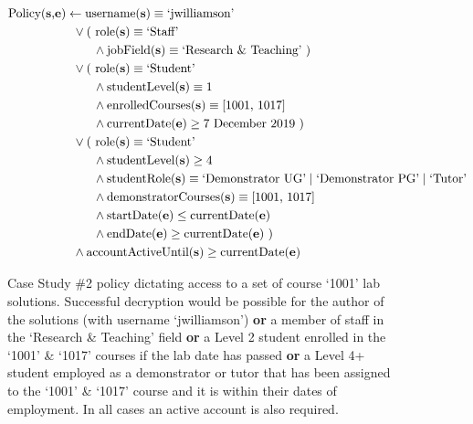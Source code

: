 \begin{figure}[ht]
  \centering
\begin{align*}
  \text{Policy(\textbf{s},\textbf{e})}
  &
    \leftarrow
    \text{username(\textbf{s})} \equiv \text{`jwilliamson'}
  \\
  &
    \phantom{::}\vee
    \text{( role(\textbf{s})} \equiv \text{`Staff'}
  \\
  &
    \phantom{::::::::}\wedge
    \text{jobField(\textbf{s})} \equiv \text{`Research \& Teaching' )}
  \\
  &
    \phantom{::}\vee
    \text{( role(\textbf{s})} \equiv \text{`Student'}
  \\
  &
    \phantom{::::::::}\wedge
    \text{studentLevel(\textbf{s})} \equiv \text{1}
  \\
  &
    \phantom{::::::::}\wedge
    \text{enrolledCourses(\textbf{s})} \equiv \text{[1001, 1017]}
  \\
  &
    \phantom{::::::::}\wedge
    \text{currentDate(\textbf{e})} \geq \text{7 December 2019 )}
  \\
  &
    \phantom{::}\vee
    \text{( role(\textbf{s})} \equiv \text{`Student'}
  \\
  &
    \phantom{::::::::}\wedge
    \text{studentLevel(\textbf{s})} \geq \text{4}
  \\
  &
    \phantom{::::::::}\wedge
    \text{studentRole(\textbf{s})} \equiv \text{`Demonstrator UG'} \mid \text{`Demonstrator PG'} \mid \text{`Tutor'}
  \\
  &
    \phantom{::::::::}\wedge
    \text{demonstratorCourses(\textbf{s})} \equiv \text{[1001, 1017]}
  \\
  &
    \phantom{::::::::}\wedge
    \text{startDate(\textbf{e})} \leq \text{currentDate(\textbf{e})}
  \\
  &
    \phantom{::::::::}\wedge
    \text{endDate(\textbf{e})} \geq \text{currentDate(\textbf{e}) )}
  \\
  &
    \phantom{::}\wedge
    \text{accountActiveUntil(\textbf{s})} \geq \text{currentDate(\textbf{e})}
\end{align*}
  \caption{
    \label{fig:case_study_policy_2}
    Case Study \#2 policy dictating access to a set of course `1001' lab solutions.
    Successful decryption would be possible for the author of the solutions (with username `jwilliamson') \textbf{or} a member of staff in the `Research \& Teaching' field \textbf{or} a Level 2 student enrolled in the `1001' \& `1017' courses if the lab date has passed \textbf{or} a Level 4+ student employed as a demonstrator or tutor that has been assigned to the `1001' \& `1017' course and it is within their dates of employment. In all cases an active account is also required.
  }
\end{figure}
